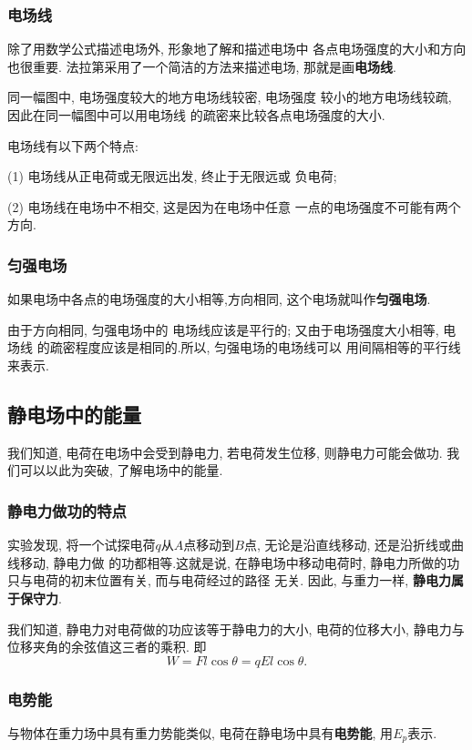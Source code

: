 \documentclass[12pt,a4paper]{ctexart}
\begin{document}
\subsubsection{电场线}

除了用数学公式描述电场外, 形象地了解和描述电场中
各点电场强度的大小和方向也很重要.
法拉第采用了一个简洁的方法来描述电场, 那就是画\textbf{电场线}.

同一幅图中, 电场强度较大的地方电场线较密, 电场强度
较小的地方电场线较疏, 因此在同一幅图中可以用电场线
的疏密来比较各点电场强度的大小.

电场线有以下两个特点:

(1) 电场线从正电荷或无限远出发, 终止于无限远或
负电荷;

(2) 电场线在电场中不相交, 这是因为在电场中任意
一点的电场强度不可能有两个方向.

\subsubsection*{匀强电场}

如果电场中各点的电场强度的大小相等,方向相同,
这个电场就叫作\textbf{匀强电场}.

由于方向相同, 匀强电场中的
电场线应该是平行的; 又由于电场强度大小相等, 电场线
的疏密程度应该是相同的.所以, 匀强电场的电场线可以
用间隔相等的平行线来表示.

\subsection{静电场中的能量}

我们知道, 电荷在电场中会受到静电力, 若电荷发生位移, 则静电力可能会做功. 我们可以以此为突破,
了解电场中的能量.

\subsubsection*{静电力做功的特点}

实验发现, 将一个试探电荷$q$从$A$点移动到$B$点, 无论是沿直线移动, 还是沿折线或曲线移动, 静电力做
的功都相等.这就是说, 在静电场中移动电荷时, 静电力所做的功只与电荷的初末位置有关, 而与电荷经过的路径
无关. 因此, 与重力一样, \textbf{静电力属于保守力}.

我们知道, 静电力对电荷做的功应该等于静电力的大小, 电荷的位移大小, 静电力与位移夹角的余弦值这三者的乘积.
即$$W = Fl\cos \theta = qEl\cos \theta.$$

\subsubsection{电势能}
与物体在重力场中具有重力势能类似, 电荷在静电场中具有\textbf{电势能}, 用$E_p$表示.
\end{document}
